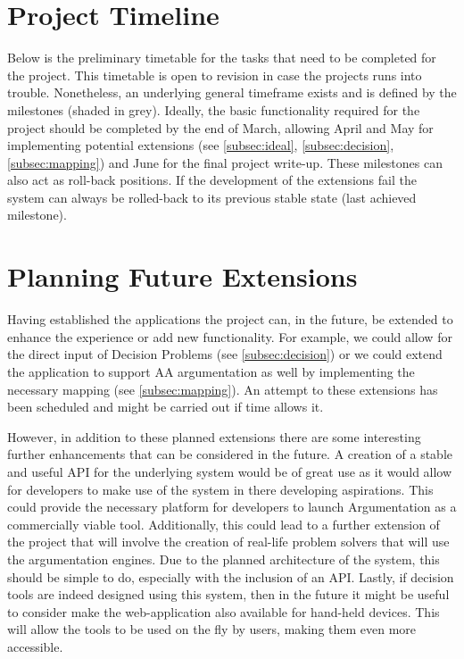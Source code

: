 \section{Project Timeline}
Below is the preliminary timetable for the tasks that need to be completed for the project. This timetable is open to revision in case the projects runs into trouble. Nonetheless, an underlying general timeframe exists and is defined by the milestones (shaded in grey). Ideally, the basic functionality required for the project should be completed by the end of March, allowing April and May for implementing potential extensions (see \cref{subsec:ideal}, \cref{subsec:decision}, \cref{subsec:mapping}) and June for the final project write-up. These milestones can also act as roll-back positions. If the development of the extensions fail the system can always be rolled-back to its previous stable state (last achieved milestone).


\section{Planning Future Extensions}
Having established the applications the project can, in the future, be extended to enhance the experience or add new functionality. For example, we could allow for the direct input of Decision Problems (see \cref{subsec:decision}) or we could extend the application to support AA argumentation as well by implementing the necessary mapping (see \cref{subsec:mapping}). An attempt to these extensions has been scheduled and might be carried out if time allows it.

However, in addition to these planned extensions there are some interesting further enhancements that can be considered in the future. A creation of a stable and useful API for the underlying system would be of great use as it would allow for developers to make use of the system in there developing aspirations. This could provide the necessary platform for developers to launch Argumentation as a commercially viable tool. Additionally, this could lead to a further extension of the project that will involve the creation of real-life problem solvers that will use the argumentation engines. Due to the planned architecture of the system, this should be simple to do, especially with the inclusion of an API. Lastly, if decision tools are indeed designed using this system, then in the future it might be useful to consider make the web-application also available for hand-held devices. This will allow the tools to be used on the fly by users, making them even more accessible.
